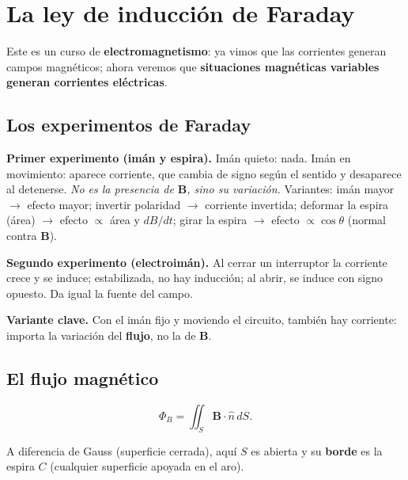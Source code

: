\documentclass[12pt,a4paper]{article}
\begin{document}


\section{La ley de inducción de Faraday}

Este es un curso de \textbf{electromagnetismo}: ya vimos que las corrientes
generan campos magnéticos; ahora veremos que \textbf{situaciones magnéticas
variables generan corrientes eléctricas}.

\subsection{Los experimentos de Faraday}

\textbf{Primer experimento (imán y espira).} Imán quieto: nada. Imán en
movimiento: aparece corriente, que cambia de signo según el sentido y
desaparece al detenerse. \emph{No es la presencia de $\mathbf{B}$, sino su
variación.} Variantes: imán mayor $\to$ efecto mayor; invertir polaridad $\to$
corriente invertida; deformar la espira (área) $\to$ efecto $\propto$ área y
$dB/dt$; girar la espira $\to$ efecto $\propto \cos\theta$ (normal contra
$\mathbf{B}$).



\textbf{Segundo experimento (electroimán).} Al cerrar un interruptor la
corriente crece y se induce; estabilizada, no hay inducción; al abrir, se
induce con signo opuesto. Da igual la fuente del campo.

\textbf{Variante clave.} Con el imán fijo y moviendo el circuito, también hay
corriente: importa la variación del \textbf{flujo}, no la de $\mathbf{B}$.



\subsection{El flujo magnético}

\begin{keybox}
  \[
  \Phi_B = \iint_S \mathbf{B}\cdot \hat{n}\, dS.
  \]
\end{keybox}

\begin{notebox}
  A diferencia de Gauss (superficie cerrada), aquí $S$ es abierta y su
  \textbf{borde} es la espira $C$ (cualquier superficie apoyada en el aro).
\end{notebox}
\end{document}

